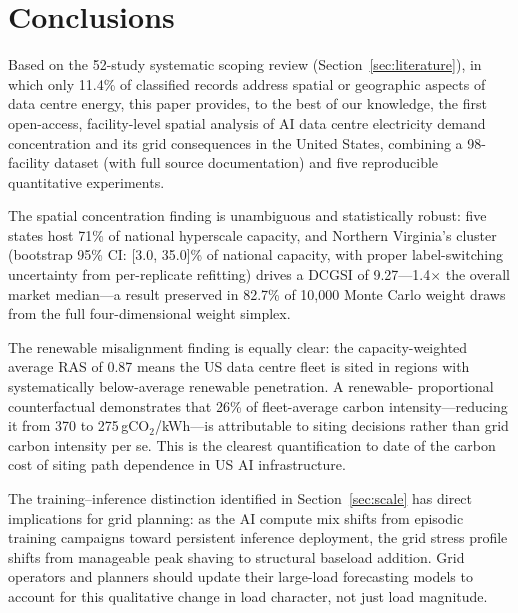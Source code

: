 \documentclass[preprint,12pt]{elsarticle}
\begin{document}
\section{Conclusions}
\label{sec:conclusions}

Based on the 52-study systematic scoping review (Section~\ref{sec:literature}),
in which only 11.4\% of classified records address spatial or geographic
aspects of data centre energy, this paper provides, to the best of our
knowledge, the first open-access, facility-level spatial analysis of AI
data centre electricity demand concentration and its grid consequences
in the United States, combining a 98-facility dataset (with full source
documentation) and five reproducible quantitative experiments.

The spatial concentration finding is unambiguous and statistically robust:
five states host 71\% of national hyperscale capacity, and Northern
Virginia's cluster (bootstrap 95\% CI: [3.0, 35.0]\% of national capacity,
with proper label-switching uncertainty from per-replicate refitting)
drives a DCGSI of 9.27---1.4$\times$ the overall market median---a
result preserved in 82.7\% of 10{,}000 Monte Carlo weight draws from the
full four-dimensional weight simplex.

\begin{sloppypar}
The renewable misalignment finding is equally clear: the capacity-weighted
average RAS of 0.87 means the US data centre fleet is sited in regions
with systematically below-average renewable penetration. A renewable-
proportional counterfactual demonstrates that 26\% of fleet-average
carbon intensity---reducing it from 370 to 275\,gCO$_2$/kWh---is
attributable to siting decisions rather than grid carbon intensity per se.
This is the clearest quantification to date of the carbon cost of
siting path dependence in US AI infrastructure.
\end{sloppypar}

The training--inference distinction identified in Section~\ref{sec:scale}
has direct implications for grid planning: as the AI compute mix shifts
from episodic training campaigns toward persistent inference deployment,
the grid stress profile shifts from manageable peak shaving to structural
baseload addition. Grid operators and planners should update their
large-load forecasting models to account for this qualitative change in
load character, not just load magnitude.
\end{document}
